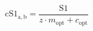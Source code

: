 \begin{equation}
    \mathrm{cS1}_\mathrm{a,b} = \frac{ \mathrm{S1} }{ z \cdot m_\mathrm{opt} + c_\mathrm{opt} }
\end{equation}










